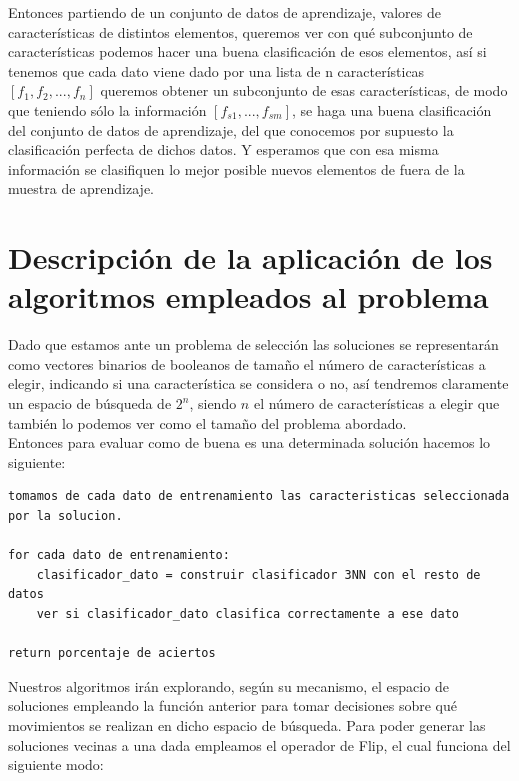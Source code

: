 \documentclass[10pt,a4paper]{article}
\begin{document}
Entonces partiendo de un conjunto de datos de aprendizaje, valores de características de distintos elementos, queremos ver con qué subconjunto de características podemos hacer una buena clasificación de esos elementos, así si tenemos que cada dato viene dado por una lista de n características $[f_1, f_2, ..., f_n]$ queremos obtener un subconjunto de esas características, de modo que teniendo sólo la información $[f_{s1}, ..., f_{sm}]$, se haga una buena clasificación del conjunto de datos de aprendizaje, del que conocemos por supuesto la clasificación perfecta de dichos datos. Y esperamos que con esa misma información se clasifiquen lo mejor posible nuevos elementos de fuera de la muestra de aprendizaje.\\

\newpage

\section{\color[rgb]{0.0,0.0,0.21}Descripción de la aplicación de los algoritmos empleados al problema}

Dado que estamos ante un problema de selección las soluciones se representarán como vectores binarios de booleanos de tamaño el número de características a elegir, indicando si una característica se considera o no, así tendremos claramente un espacio de búsqueda de $2^n$, siendo $n$ el número de características a elegir que también lo podemos ver como el tamaño del problema abordado.\\

Entonces para evaluar como de buena es una determinada solución hacemos lo siguiente:\\

\begin{lstlisting}
tomamos de cada dato de entrenamiento las caracteristicas seleccionada por la solucion.

for cada dato de entrenamiento:
	clasificador_dato = construir clasificador 3NN con el resto de datos
	ver si clasificador_dato clasifica correctamente a ese dato
	
return porcentaje de aciertos
\end{lstlisting}

Nuestros algoritmos irán explorando, según su mecanismo, el espacio de soluciones empleando la función anterior para tomar decisiones sobre qué movimientos se realizan en dicho espacio de búsqueda. Para poder generar las soluciones vecinas a una dada empleamos el operador de Flip, el cual funciona del siguiente modo:\\
\end{document}
